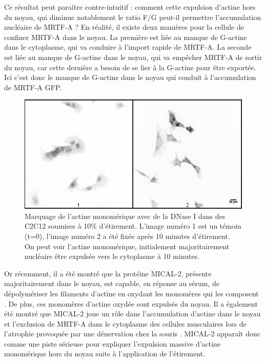 Ce résultat peut paraître contre-intuitif : comment cette expulsion d'actine hors du noyau, qui diminue notablement le ratio F/G peut-il permettre l'accumulation nucléaire de MRTF-A ? En réalité, il existe deux manières pour la cellule de confiner MRTF-A dans le noyau. La première est liée au manque de G-actine dans le cytoplasme, qui va conduire à l'import rapide de MRTF-A. La seconde est liée au manque de G-actine dans le noyau, qui va empêcher MRTF-A de sortir du noyau, car cette dernière a besoin de se lier à la G-actine pour être exportée. Ici c'est donc le manque de G-actine dans le noyau qui conduit à l'accumulation de MRTF-A GFP. 

\begin{figure}
\includegraphics[scale=0.6]{Figures/Expusion2_impress.png} 
\caption{\label{expulsion} Marquage de l'actine monomérique avec de la DNase I dans des C2C12 soumises à 10\% d'étirement. L'image numéro 1 est un témoin (t=0), l'image numéro 2 a été fixée après 10 minutes d'étirement. On peut voir l'actine monomérique, initialement majoritairement nucléaire être expulsée vers le cytoplasme à 10 minutes.}
\end{figure}
Or récemment, il a été montré que la protéine MICAL-2, présente majoritairement dans le noyau, est capable, en réponse au sérum, de dépolymériser les filaments d'actine en oxydant les monomères qui les composent \parencite{lundquist_redox_2014}. De plus, ces monomères d'actine oxydée sont expulsés du noyau. Il a également été montré que MICAL-2 joue un rôle dans l'accumulation d'actine dans le noyau et l'exclusion de MRTF-A dans le cytoplasme des cellules musculaires lors de l'atrophie provoquée par une dénervation chez la souris \parencite{collard_nuclear_2014}. MICAL-2 apparaît donc comme une piste sérieuse pour expliquer l'expulsion massive d'actine monomérique hors du noyau suite à l'application de l'étirement. 

